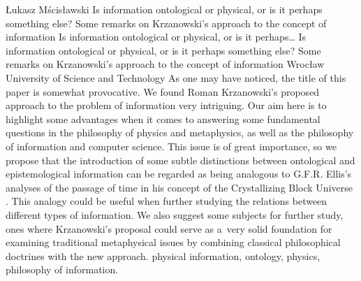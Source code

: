\begin{artengenv}{Łukasz Mścisławski}
	{Is information ontological or physical, or is it perhaps something else? Some remarks on Krzanowski's approach to the concept of information}
	{Is information ontological or physical, or is it perhaps\ldots}
	{Is information ontological or physical, or is it perhaps something else? Some remarks on Krzanowski's approach to the concept of information}
	{Wrocław University of Science and Technology}
	{As one may have noticed, the title of this paper is somewhat provocative. We found Roman Krzanowski's
	\parencites*[][]{krzanowski_does_2020}[][]{krzanowski_what_2020}[][]{krzanowski_why_2020}[][]{krzanowski_ontological_2022} %
	 proposed approach to the problem of information very intriguing. Our aim here is to highlight some advantages when it comes to answering some fundamental questions in the philosophy of physics and metaphysics, as well as the philosophy of information and computer science. This issue is of great importance, so we propose that the introduction of some subtle distinctions between ontological and epistemological information can be regarded as being analogous to G.F.R. Ellis's analyses of the passage of time in his concept of the Crystallizing Block Universe 
	\parencite[][]{ellis_space_2012}. %
	 This analogy could be useful when further studying the relations between different types of information. We also suggest some subjects for further study, ones where Krzanowski's proposal could serve as a~very solid foundation for examining traditional metaphysical issues by combining classical philosophical doctrines with the new approach.
	}
	{physical information, ontology, physics, philosophy of information.}



\end{artengenv}
